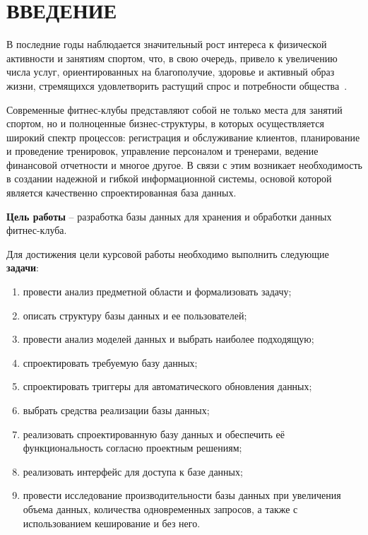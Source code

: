 \section*{ВВЕДЕНИЕ}

В последние годы наблюдается значительный рост интереса к физической активности и занятиям спортом, что, в свою очередь, привело к увеличению числа услуг, ориентированных на благополучие, здоровье и активный образ жизни, стремящихся удовлетворить растущий спрос и потребности общества~\cite{IHRSA2019}. 

Современные фитнес-клубы представляют собой не только места для занятий спортом, но и полноценные бизнес-структуры, в которых осуществляется широкий спектр процессов: регистрация и обслуживание клиентов, планирование и проведение тренировок, управление персоналом и тренерами, ведение финансовой отчетности и многое другое. В связи с этим возникает необходимость в создании надежной и гибкой информационной системы, основой которой является качественно спроектированная база данных.

\textbf{Цель работы} -- разработка базы данных для хранения и обработки данных фитнес-клуба. 

Для достижения цели курсовой работы необходимо выполнить следующие \textbf{задачи}: 

\begin{enumerate}[label=\arabic*)]
	\item провести анализ предметной области и формализовать задачу;
	\item описать структуру базы данных и ее пользователей;
	\item провести анализ моделей данных и выбрать наиболее подходящую;
	\item спроектировать требуемую базу данных;
	\item спроектировать триггеры для автоматического обновления данных;
	\item выбрать средства реализации базы данных;
	\item реализовать спроектированную базу данных и обеспечить её функциональность согласно проектным решениям;
	\item реализовать интерфейс для доступа к базе данных;
	\item провести исследование производительности базы данных при увеличения объема данных, количества одновременных запросов, а также с использованием кеширование и без него.
\end{enumerate}

